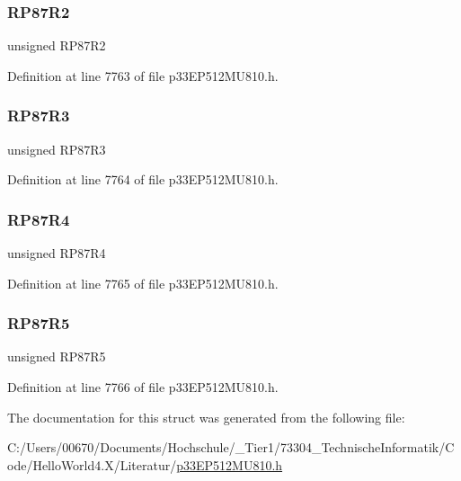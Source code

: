 \subsubsection{\texorpdfstring{R\+P87\+R2}{RP87R2}}
{\footnotesize\ttfamily unsigned R\+P87\+R2}



Definition at line 7763 of file p33\+E\+P512\+M\+U810.\+h.

\mbox{\label{structtag_r_p_o_r6_b_i_t_s_a596973e9a5804dd2e7c67f39e6418bda}} 
\subsubsection{\texorpdfstring{R\+P87\+R3}{RP87R3}}
{\footnotesize\ttfamily unsigned R\+P87\+R3}



Definition at line 7764 of file p33\+E\+P512\+M\+U810.\+h.

\mbox{\label{structtag_r_p_o_r6_b_i_t_s_a666f59c08374dae535dac1b61a3e3c2a}} 
\subsubsection{\texorpdfstring{R\+P87\+R4}{RP87R4}}
{\footnotesize\ttfamily unsigned R\+P87\+R4}



Definition at line 7765 of file p33\+E\+P512\+M\+U810.\+h.

\mbox{\label{structtag_r_p_o_r6_b_i_t_s_a68a469bb8d944635d5648b99d83cf49e}} 
\subsubsection{\texorpdfstring{R\+P87\+R5}{RP87R5}}
{\footnotesize\ttfamily unsigned R\+P87\+R5}



Definition at line 7766 of file p33\+E\+P512\+M\+U810.\+h.



The documentation for this struct was generated from the following file\+:\begin{DoxyCompactItemize}
\item 
C\+:/\+Users/00670/\+Documents/\+Hochschule/\+\_\+\+Tier1/73304\+\_\+\+Technische\+Informatik/\+Code/\+Hello\+World4.\+X/\+Literatur/\hyperlink{p33_e_p512_m_u810_8h}{p33\+E\+P512\+M\+U810.\+h}\end{DoxyCompactItemize}
